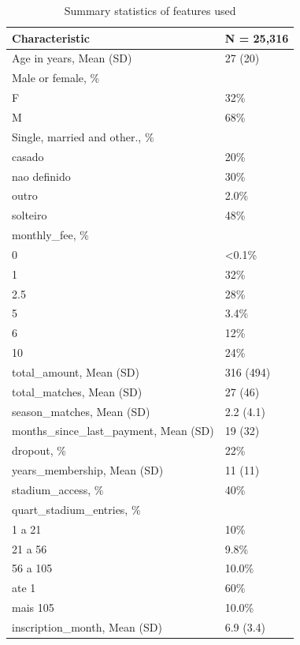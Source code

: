 \documentclass[
  12pt,
]{article}
\begin{document}
\begin{table}

\caption{\label{tab:summarytable}Summary statistics of features used}
\centering
\begin{tabular}[t]{ll}
\toprule
Characteristic & N = 25,316\\
\midrule
Age in years, Mean (SD) & 27 (20)\\
Male or female, \% & \\
\hspace{1em}F & 32\%\\
\hspace{1em}M & 68\%\\
Single, married and other., \% & \\
\addlinespace
\hspace{1em}casado & 20\%\\
\hspace{1em}nao definido & 30\%\\
\hspace{1em}outro & 2.0\%\\
\hspace{1em}solteiro & 48\%\\
monthly\_fee, \% & \\
\addlinespace
\hspace{1em}0 & <0.1\%\\
\hspace{1em}1 & 32\%\\
\hspace{1em}2.5 & 28\%\\
\hspace{1em}5 & 3.4\%\\
\hspace{1em}6 & 12\%\\
\addlinespace
\hspace{1em}10 & 24\%\\
total\_amount, Mean (SD) & 316 (494)\\
total\_matches, Mean (SD) & 27 (46)\\
season\_matches, Mean (SD) & 2.2 (4.1)\\
months\_since\_last\_payment, Mean (SD) & 19 (32)\\
\addlinespace
dropout, \% & 22\%\\
years\_membership, Mean (SD) & 11 (11)\\
stadium\_access, \% & 40\%\\
quart\_stadium\_entries, \% & \\
\hspace{1em}1 a 21 & 10\%\\
\addlinespace
\hspace{1em}21 a 56 & 9.8\%\\
\hspace{1em}56 a 105 & 10.0\%\\
\hspace{1em}ate 1 & 60\%\\
\hspace{1em}mais 105 & 10.0\%\\
inscription\_month, Mean (SD) & 6.9 (3.4)\\
\bottomrule
\end{tabular}
\end{table}
\end{document}
